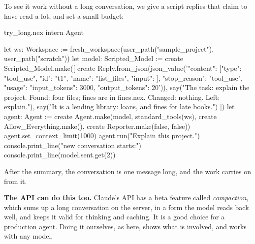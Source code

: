 To see it work without a long conversation, we give a script replies that
claim to have read a lot, and set a small budget:

\begin{tryit}{try_long.nex}
intern Agent

let ws: Workspace := fresh_workspace(user_path("sample_project"), user_path("scratch"))
let model: Scripted_Model := create Scripted_Model.make([
  create Reply.from_json(json_value('{"content": [{"type": "tool_use", "id": "t1", "name": "list_files", "input": {}}], "stop_reason": "tool_use", "usage": {"input_tokens": 3000, "output_tokens": 20}}')),
  say("The task: explain the project. Found: four files; fines are in fines.nex. Changed: nothing. Left: explain."),
  say("It is a lending library: loans, and fines for late books.")
])
let agent: Agent := create Agent.make(model, standard_tools(ws), create Allow_Everything.make(),
  create Reporter.make(false, false))
agent.set_context_limit(1000)
agent.run("Explain this project.")
console.print_line("\nThe new conversation starts:")
console.print_line(model.sent.get(2))
\end{tryit}

After the summary, the conversation is one message long, and the work
carries on from it.

\begin{aside}
\textbf{The API can do this too.} Claude's API has a beta feature called
\emph{compaction}, which sums up a long conversation on the server, in
a form the model reads back well, and keeps it valid for thinking and
caching. It is a good choice for a production agent. Doing it ourselves,
as here, shows what is involved, and works with any model.
\end{aside}
